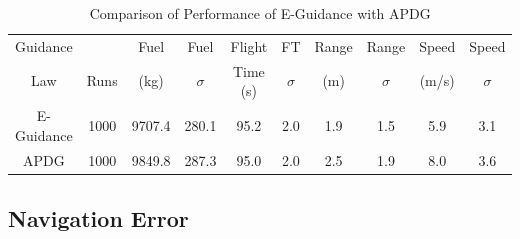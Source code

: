 \begin{table}[ht]                                                                                              
	\centering        
	\caption{Comparison of Performance of E-Guidance with APDG}                     
	\label{tab:EvsAPDG}                                                                                              
	\begin{tabular}{|c|c|c|c|c|c|c|c|c|c|}                                                                         
		\hline                                                                                                        Guidance &      &   Fuel   &    Fuel   & Flight    &   FT     &  Range    &  Range   & Speed   &   Speed  \\ 
		Law      & Runs & (kg)      & $\sigma$ &  Time (s) & $\sigma$ &  (m) &    $  \sigma$ & (m/s)   & $\sigma$ \\
		
		\hline                                                                                                         
		E-Guidance  & 1000 & 9707.4 & 280.1 & 95.2 & 2.0 & 1.9 & 1.5 & 5.9 & 3.1 \\                                     
		\hline                                                                                                         
		APDG  & 1000 & 9849.8 & 287.3 & 95.0 & 2.0 & 2.5 & 1.9 & 8.0 & 3.6 \\                                       
		\hline                                                                                                         
	\end{tabular}                                                                                                  
	
\end{table}      

\subsection{Navigation Error} \label{sec:naverror}

